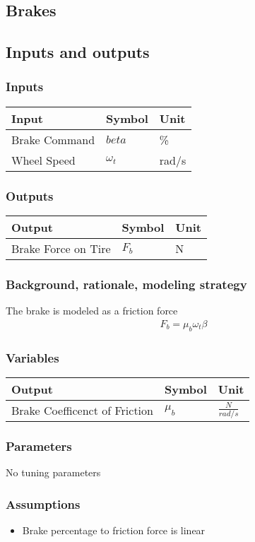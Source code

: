 \documentclass[../SimBALink.tex]{subfiles}
\begin{document}
\subsection{Brakes}

\subsection{Inputs and outputs}
	\subsubsection{Inputs}
	\begin{tabular}{ l | l | l  }
		Input					&	Symbol		&	Unit		\\	\hline
		Brake Command			& 	$beta$ 		&	\% \\
		Wheel Speed				&	$\omega_t$	&	rad/s
	\end{tabular}
	
	\subsubsection{Outputs}
	\begin{tabular}{ l | l | l  }
		Output					&	Symbol		&	Unit		\\	\hline
		Brake Force on Tire		&	$F_b$		&	N
	\end{tabular}

\subsubsection{Background, rationale, modeling strategy}
The brake is modeled as a friction force 
		\begin{gather}
			F_b = \mu_b \omega_t \beta
		\end{gather}

\subsubsection{Variables}
	\begin{tabular}{ l | l | l  }
		Output					&	Symbol		&	Unit		\\	\hline
		Brake Coefficenct of Friction		&	$\mu_b$		&	 $\frac{N}{rad/s}$ 
	\end{tabular}
\subsubsection{Parameters}
No tuning parameters


\subsubsection{Assumptions}
\begin{itemize}
  \item Brake percentage to friction force is linear
\end{itemize}
\end{document}
